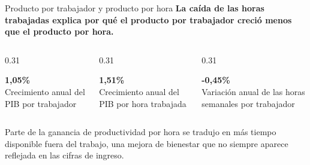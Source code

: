 \documentclass[aspectratio=169,11pt]{beamer}
\newcommand{\idea}[1]{\textbf{\color{cjcblue}#1}}
\begin{document}
\begin{frame}{Producto por trabajador y producto por hora}
  \idea{La caída de las horas trabajadas explica por qué el producto por trabajador creció menos que el producto por hora.}

  \vspace{0.35cm}
  \begin{columns}[T,totalwidth=\textwidth]
    \begin{column}{0.31\textwidth}
      \begin{center}
        {\Huge\bfseries\color{cjcblue}1,05\%}\\
        \vspace{0.1cm}
        {\small Crecimiento anual del PIB por trabajador}
      \end{center}
    \end{column}
    \begin{column}{0.31\textwidth}
      \begin{center}
        {\Huge\bfseries\color{cjcblue}1,51\%}\\
        \vspace{0.1cm}
        {\small Crecimiento anual del PIB por hora trabajada}
      \end{center}
    \end{column}
    \begin{column}{0.31\textwidth}
      \begin{center}
        {\Huge\bfseries\color{cjcgray}-0,45\%}\\
        \vspace{0.1cm}
        {\small Variación anual de las horas semanales por trabajador}
      \end{center}
    \end{column}
  \end{columns}

  \vspace{0.55cm}
  Parte de la ganancia de productividad por hora se tradujo en más tiempo disponible fuera del trabajo, una mejora de bienestar que no siempre aparece reflejada en las cifras de ingreso.
\end{frame}
\end{document}
